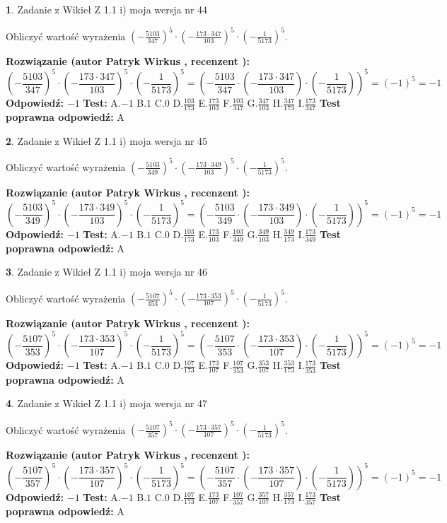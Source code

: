 \documentclass[12pt, a4paper]{article}
\theoremstyle{definition} %
\newtheorem{zad}{}
\newcommand{\zadStart}[1]{\begin{zad}#1\newline}
\newcommand{\zadStop}{\end{zad}}
\newcommand{\rozwStart}[2]{\noindent \textbf{Rozwiązanie (autor #1 , recenzent #2): }\newline}
\newcommand{\rozwStop}{\newline}
\newcommand{\odpStart}{\noindent \textbf{Odpowiedź:}\newline}
\newcommand{\odpStop}{\newline}
\newcommand{\testStart}{\noindent \textbf{Test:}\newline}
\newcommand{\testStop}{\newline}
\newcommand{\kluczStart}{\noindent \textbf{Test poprawna odpowiedź:}\newline}
\newcommand{\kluczStop}{\newline}
\begin{document}
\zadStart{Zadanie z Wikieł Z 1.1 i) moja wersja nr 44}

Obliczyć wartość wyrażenia $(-\frac{5103}{347})^{5} \cdot (-\frac{173 \cdot 347}{103})^{5} \cdot (-\frac{1}{5173})^{5}$.
\zadStop
\rozwStart{Patryk Wirkus}{}
$$(-\frac{5103}{347})^{5} \cdot (-\frac{173 \cdot 347}{103})^{5} \cdot (-\frac{1}{5173})^{5} = (-\frac{5103}{347} \cdot (-\frac{173 \cdot 347}{103}) \cdot (-\frac{1}{5173}))^{5} = (-1)^{5} = -1$$
\rozwStop
\odpStart
$-1$
\odpStop
\testStart
A.$-1$ B.$1$ C.$0$ D.$\frac{103}{173}$ E.$\frac{173}{103}$
F.$\frac{103}{347}$ G.$\frac{347}{103}$
H.$\frac{347}{173}$
I.$\frac{173}{347}$
\testStop
\kluczStart
A
\kluczStop



\zadStart{Zadanie z Wikieł Z 1.1 i) moja wersja nr 45}

Obliczyć wartość wyrażenia $(-\frac{5103}{349})^{5} \cdot (-\frac{173 \cdot 349}{103})^{5} \cdot (-\frac{1}{5173})^{5}$.
\zadStop
\rozwStart{Patryk Wirkus}{}
$$(-\frac{5103}{349})^{5} \cdot (-\frac{173 \cdot 349}{103})^{5} \cdot (-\frac{1}{5173})^{5} = (-\frac{5103}{349} \cdot (-\frac{173 \cdot 349}{103}) \cdot (-\frac{1}{5173}))^{5} = (-1)^{5} = -1$$
\rozwStop
\odpStart
$-1$
\odpStop
\testStart
A.$-1$ B.$1$ C.$0$ D.$\frac{103}{173}$ E.$\frac{173}{103}$
F.$\frac{103}{349}$ G.$\frac{349}{103}$
H.$\frac{349}{173}$
I.$\frac{173}{349}$
\testStop
\kluczStart
A
\kluczStop



\zadStart{Zadanie z Wikieł Z 1.1 i) moja wersja nr 46}

Obliczyć wartość wyrażenia $(-\frac{5107}{353})^{5} \cdot (-\frac{173 \cdot 353}{107})^{5} \cdot (-\frac{1}{5173})^{5}$.
\zadStop
\rozwStart{Patryk Wirkus}{}
$$(-\frac{5107}{353})^{5} \cdot (-\frac{173 \cdot 353}{107})^{5} \cdot (-\frac{1}{5173})^{5} = (-\frac{5107}{353} \cdot (-\frac{173 \cdot 353}{107}) \cdot (-\frac{1}{5173}))^{5} = (-1)^{5} = -1$$
\rozwStop
\odpStart
$-1$
\odpStop
\testStart
A.$-1$ B.$1$ C.$0$ D.$\frac{107}{173}$ E.$\frac{173}{107}$
F.$\frac{107}{353}$ G.$\frac{353}{107}$
H.$\frac{353}{173}$
I.$\frac{173}{353}$
\testStop
\kluczStart
A
\kluczStop



\zadStart{Zadanie z Wikieł Z 1.1 i) moja wersja nr 47}

Obliczyć wartość wyrażenia $(-\frac{5107}{357})^{5} \cdot (-\frac{173 \cdot 357}{107})^{5} \cdot (-\frac{1}{5173})^{5}$.
\zadStop
\rozwStart{Patryk Wirkus}{}
$$(-\frac{5107}{357})^{5} \cdot (-\frac{173 \cdot 357}{107})^{5} \cdot (-\frac{1}{5173})^{5} = (-\frac{5107}{357} \cdot (-\frac{173 \cdot 357}{107}) \cdot (-\frac{1}{5173}))^{5} = (-1)^{5} = -1$$
\rozwStop
\odpStart
$-1$
\odpStop
\testStart
A.$-1$ B.$1$ C.$0$ D.$\frac{107}{173}$ E.$\frac{173}{107}$
F.$\frac{107}{357}$ G.$\frac{357}{107}$
H.$\frac{357}{173}$
I.$\frac{173}{357}$
\testStop
\kluczStart
A
\kluczStop
\end{document}
